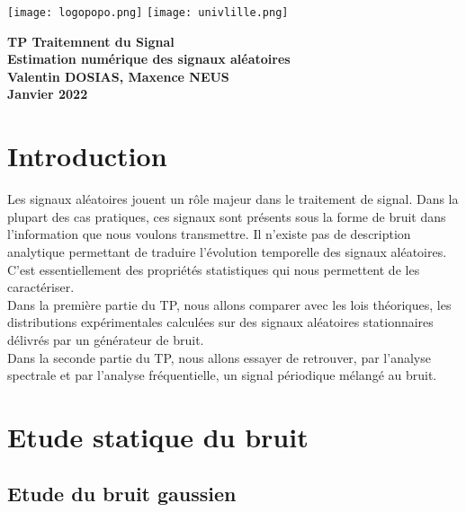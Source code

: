 \documentclass[oneside,a4paper,12pt]{article}
\begin{document}
	\begin{titlepage}
		\texttt{[image: logopopo.png]}
		\hspace*{\fill}
		\texttt{[image: univlille.png]}
		
		\begin{center}
			\vspace{1cm}
			\textbf{TP Traitemnent du Signal}\\
			\textbf{Estimation numérique des signaux aléatoires}\\
			\vspace{1cm}
			\textbf{Valentin DOSIAS, Maxence NEUS}\\
			\vspace{3cm}
			\vspace{\fill}
			\textbf{Janvier 2022}\\
		\end{center}
	\end{titlepage}
	
	\tableofcontents
	\vspace*{\fill}
	
	\section{Introduction}
	
	Les signaux aléatoires jouent un rôle majeur dans le traitement de signal. Dans la plupart des cas pratiques, ces signaux sont présents sous la forme de bruit dans l’information que nous voulons transmettre. Il n’existe pas de description analytique permettant de traduire l'évolution temporelle des signaux aléatoires. C’est essentiellement des propriétés statistiques qui nous permettent de les caractériser.\\
	Dans la première partie du TP, nous allons comparer avec les lois théoriques, les distributions expérimentales calculées sur des signaux aléatoires stationnaires délivrés par un générateur de bruit.\\
	Dans la seconde partie du TP, nous allons essayer de retrouver, par l’analyse spectrale et par l’analyse fréquentielle, un signal périodique mélangé au bruit. 
	\newpage
	
	\section{Etude statique du bruit}
	
	\subsection{Etude du bruit gaussien}
	
\end{document}
